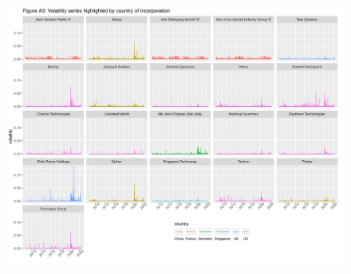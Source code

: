 \documentclass[
  letterpaper,
  DIV=11,
  numbers=noendperiod]{scrartcl}
\begin{document}
\begin{figure}
\centering
  \includegraphics{plots/figA3.png}
\end{figure}
\end{document}
